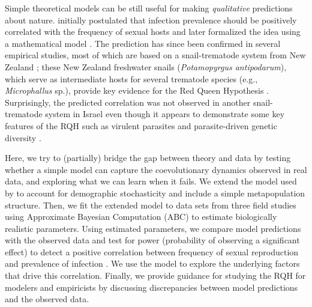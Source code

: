 \documentclass{article}\usepackage[]{graphicx}\usepackage[]{color}
\begin{document}
Simple theoretical models can be still useful for making \emph{qualitative} predictions about 
nature.
\cite{lively1992parthenogenesis} initially postulated that infection prevalence should
be positively correlated with the frequency of sexual hosts and later formalized the
idea using a mathematical model \citep{lively2001trematode}.
The prediction has since been confirmed in several empirical studies, most of which 
are based on a snail-trematode system from New Zealand 
\citep{lively2002temporal, kumpulainen2004parasites, king2011parasites, vergara2013geographic, mckone2016fine, gibson2016within}; 
these New Zealand freshwater snails (\textit{Potamopyrgus antipodarum}), which serve 
as intermediate hosts for several trematode species (e.g., \textit{Microphallus} sp.), 
provide key evidence for the Red Queen Hypothesis
\citep{lively1987evidence, lively2001trematode, lively2002temporal, lively2004host, koskella2009evidence,
king2011coevolutionary, king2011parasites,
vergara2013geographic, vergara2014infection, mckone2016fine, gibson2018periodic}.
Surprisingly, the predicted correlation was not observed in another snail-trematode system in Israel \citep{heller1990sexual, ben2005spatial, ben2007temporal, ben2008sex, dagan2013clonal} even though it appears to demonstrate some key features of the RQH such as virulent parasites \citep{ben2005spatial} and parasite-driven genetic diversity \citep{dagan2013clonal}.

Here, we try to (partially) bridge the gap between theory and data by testing whether a simple model can capture the coevolutionary dynamics observed in real data, and exploring what we can learn when it fails.
We extend the model used by \cite{lively2010epidemiological} to account for 
demographic stochasticity and include a simple metapopulation structure.
Then, we fit the extended model to data sets from three field studies 
\citep{dagan2013clonal, mckone2016fine, vergara2014infection} 
using Approximate Bayesian Computation (ABC) to estimate biologically realistic 
parameters.
Using estimated parameters, we compare model predictions with the observed
data and test for power (probability of observing a 
significant effect) to detect a positive correlation between frequency of
sexual reproduction and prevalence of infection \cite{lively2001trematode}.
We use the model to explore the underlying factors that drive this correlation.
Finally, we provide guidance for studying the RQH for modelers and empiricists
by discussing discrepancies between model predictions and the observed data.
\end{document}
